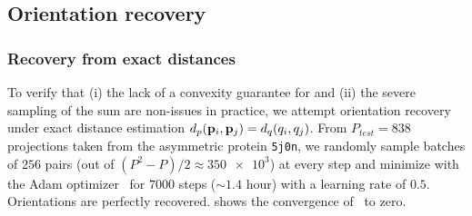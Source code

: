 
\subsection{Orientation recovery}\label{sec:results:orientation-recovery}


\subsubsection{Recovery from exact distances}\label{sec:results:orientation-recovery:exact}


To verify that (i) the lack of a convexity guarantee for  and (ii) the severe sampling of the sum are non-issues in practice, we attempt orientation recovery under exact distance estimation $d_p(\mathbf{p}_i, \mathbf{p}_j) = d_q(q_i, q_j)$.
From $P_{test}=838$ projections taken from the asymmetric protein \texttt{5j0n}, we randomly sample batches of $256$ pairs (out of $(P^2-P)/2 \approx \num{350e3}$) at every step and minimize  with the Adam optimizer~\cite{kingma2014adam} for $\num{7000}$ steps ($\sim 1.4$ hour) with a learning rate of $0.5$.
Orientations are perfectly recovered.
 shows the convergence of~ to zero.

